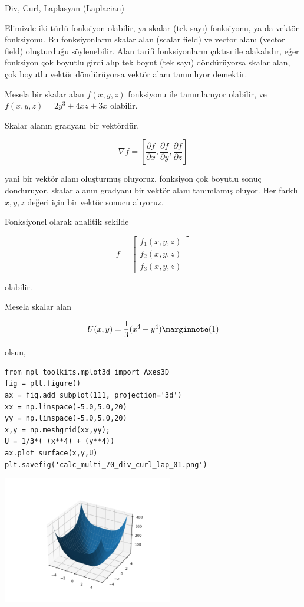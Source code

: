 \documentclass[12pt,fleqn]{article}\usepackage{../../common}
\begin{document}
Div, Curl, Laplasyan (Laplacian)

Elimizde iki türlü fonksiyon olabilir, ya skalar (tek sayı) fonksiyonu, ya da
vektör fonksiyonu. Bu fonksiyonların skalar alan (scalar field) ve vector alanı
(vector field) oluşturduğu söylenebilir. Alan tarifi fonksiyonların çıktısı ile
alakalıdır, eğer fonksiyon çok boyutlu girdi alıp tek boyut (tek sayı)
döndürüyorsa skalar alan, çok boyutlu vektör döndürüyorsa vektör alanı
tanımlıyor demektir.

Mesela bir skalar alan $f(x,y,z)$ fonksiyonu ile tanımlanıyor olabilir, ve
$f(x,y,z) = 2y^3 + 4 xz + 3x$ olabilir.

Skalar alanın gradyanı bir vektördür,

$$
\nabla f = \left[
  \frac{\partial f}{\partial x}, 
  \frac{\partial f}{\partial y}, 
  \frac{\partial f}{\partial z}
\right]
$$

yani bir vektör alanı oluşturmuş oluyoruz, fonksiyon çok boyutlu sonuç
donduruyor, skalar alanın gradyanı bir vektör alanı tanımlamış oluyor. Her
farklı $x,y,z$ değeri için bir vektör sonucu alıyoruz.

Fonksiyonel olarak analitik sekilde

$$
f = \left[\begin{array}{r} f_1(x,y,z) \\ f_2(x,y,z) \\ f_3(x,y,z) \end{array}\right]
$$

olabilir.

Mesela skalar alan

$$
U(x,y) = \frac{1}{3} (x^4 + y^4)
\mlabel{1}
$$

olsun,

\begin{verbatim}
from mpl_toolkits.mplot3d import Axes3D
fig = plt.figure()
ax = fig.add_subplot(111, projection='3d')
xx = np.linspace(-5.0,5.0,20)
yy = np.linspace(-5.0,5.0,20)
x,y = np.meshgrid(xx,yy);
U = 1/3*( (x**4) + (y**4))
ax.plot_surface(x,y,U)
plt.savefig('calc_multi_70_div_curl_lap_01.png')
\end{verbatim}

\includegraphics[width=20em]{calc_multi_70_div_curl_lap_01.png}
\end{document}

